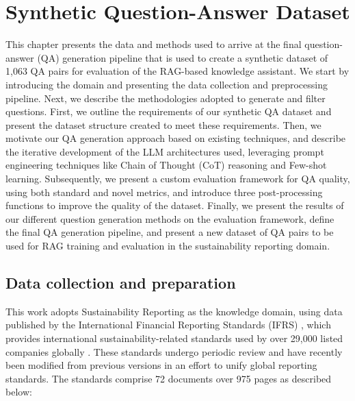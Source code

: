 \chapter{Synthetic Question-Answer Dataset }

This chapter presents the data and methods used to arrive at the final question-answer (QA) generation pipeline that is used to create a synthetic dataset of 1,063 QA pairs for evaluation of the RAG-based knowledge assistant. We start by introducing the domain and presenting the data collection and preprocessing pipeline. Next, we describe the methodologies adopted to generate and filter questions. First, we outline the requirements of our synthetic QA dataset and present the dataset structure created to meet these requirements. Then, we motivate our QA generation approach based on existing techniques, and describe the iterative development of the LLM architectures used, leveraging prompt engineering techniques like Chain of Thought (CoT) reasoning and Few-shot learning. Subsequently, we present a custom evaluation framework for QA quality, using both standard and novel metrics, and introduce three post-processing functions to improve the quality of the dataset. Finally, we present the results of our different question generation methods on the evaluation framework, define the final QA generation pipeline, and present a new dataset of QA pairs to be used for RAG training and evaluation in the sustainability reporting domain.




\section{Data collection and preparation}\label{data_collection}

This work adopts Sustainability Reporting as the knowledge domain, using data published by the International Financial Reporting Standards (IFRS) \cite{ifrsorgc9:online}, which provides international sustainability-related standards used by over 29,000 listed companies globally \cite{ifrs_companies}. These standards undergo periodic review and have recently been modified from previous versions in an effort to unify global reporting standards. The standards comprise 72 documents over 975 pages as described below:

